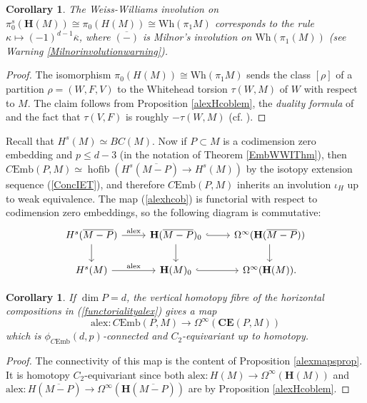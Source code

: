 \documentclass[a4paper, oneside]{amsart}
\newcommand{\hofib}{\operatorname{hofib}}
\newcommand{\cemb}{C\mathrm{Emb}}
\newcommand{\1}{\mathds{1}}
\newtheorem{cor}[thm]{Corollary}
\theoremstyle{remark}
\theoremstyle{definition}
\newcommand{\Wh}{\mathrm{Wh}}
\newcommand{\Hsp}{\mathbf{H}}
\newcommand{\CEsp}{\mathbf{CE}}
\numberwithin{equation}{section}
\begin{document}
\begin{cor}\label{milnorinvcor}
    The Weiss-Williams involution on $\pi_0^s(\Hsp(M))\cong\pi_0(H(M))\cong\Wh(\pi_1M)$ corresponds to the rule $\kappa\mapsto (-1)^{d-1}\overline{\kappa}$, where $\overline{(-)}$ is Milnor's involution \cite{MilnorWhiteheadTorsion} on $\Wh(\pi_1(M))$ (see Warning \ref{Milnorinvolutionwarning}).
\end{cor}
\begin{proof}
    The isomorphism $\pi_0(H(M))\cong \Wh(\pi_1M)$ sends the class $[\rho]$ of a partition $\rho=(W,F,V)$ to the Whitehead torsion $\tau(W,M)$ of $W$ with respect to $M$. The claim follows from Proposition \ref{alexHcoblem}, the \textit{duality formula} of \cite[\S 10]{MilnorWhiteheadTorsion} and the fact that $\tau(V,F)$ is roughly $-\tau(W,M)$ (cf. \cite[Lem. 7.8]{MilnorWhiteheadTorsion}).
\end{proof}


Recall that $H^s(M)\simeq BC(M)$. Now if $P\subset M$ is a codimension zero embedding and $p\leq d-3$ (in the notation of Theorem \ref{EmbWWIThm}), then $\cemb(P,M)\simeq \hofib(H^s(\overline{M-P})\to H^s(M))$ by the isotopy extension sequence (\ref{ConcIET}), and therefore $\cemb(P,M)$ inherits an involution $\iota_H$ up to weak equivalence. The map (\ref{alexhcob}) is functorial with respect to codimension zero embeddings, so the following diagram is commutative:
\begin{equation}\label{functorialityalex}
\begin{tikzcd}
    H^s(\overline{M-P})\dar\rar["\mathrm{alex}"] &\Hsp(\overline{M-P})_0\dar\rar[hook] & \Omega^\infty(\Hsp(\overline{M-P}))\dar\\
    H^s(M)\rar["\mathrm{alex}"] &\Hsp(M)_0\rar[hook] & \Omega^\infty(\Hsp(M)).
\end{tikzcd}
\end{equation}

\begin{cor}\label{WWhcobcor}
If $\dim P=d$, the vertical homotopy fibre of the horizontal compositions in (\ref{functorialityalex}) gives a map
$$
\mathrm{alex}: \cemb(P,M)\longrightarrow \Omega^\infty(\CEsp(P,M))
$$
which is $\phi_{\cemb}(d,p)$-connected and $C_2$-equivariant up to homotopy. 
\end{cor}
\begin{proof}
     The connectivity of this map is the content of Proposition \ref{alexmapsprop}. It is homotopy $C_2$-equivariant since both $\mathrm{alex}: H(M)\to \Omega^\infty(\Hsp(M))$ and $\mathrm{alex}: H(\overline{M-P})\to \Omega^\infty(\Hsp(\overline{M-P}))$ are by Proposition \ref{alexHcoblem}.
\end{proof}
\end{document}
